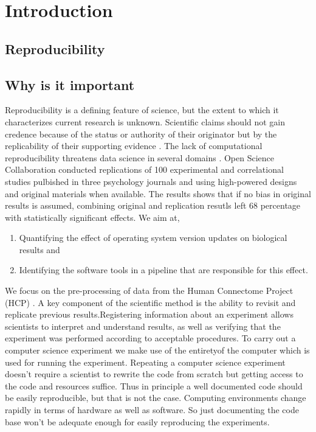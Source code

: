 \chapter{Introduction}
\section{Reproducibility}
\section{Why is it important}
Reproducibility is a defining feature of science, but the extent to which it characterizes current research is unknown. Scientific claims should not gain credence because of the status or authority of their originator but by the replicability of their supporting evidence \cite{aac4716}. The lack of computational reproducibility threatens data science in several domains \cite{Gla15}. Open Science Collaboration \cite{aac4716} conducted replications of 100 experimental and correlational studies pulbished in three psychology journals and using high-powered designs and original materials when available. The results shows that if no bias in original results is assumed, combining original and replication resutls left 68 percentage with statistically significant effects.
We aim at,
\begin{enumerate} 
  \item  Quantifying the effect of operating system version updates on biological results and 
  \item  Identifying the software tools in a pipeline that are responsible for this effect.
\end{enumerate} 
We focus on the pre-processing of data from the Human Connectome Project (HCP) \cite{Gla13}.
A key component of the scientific method is the ability to revisit and replicate previous results.Registering information about an experiment allows scientists to interpret and
understand results, as well as verifying that the experiment was performed according to acceptable procedures. To carry out a computer science experiment we make use of the entiretyof the computer which is used for running the experiment. Repeating a computer science experiment doesn't require a scientist to rewrite the code from scratch but getting access to the code and resources suffice. Thus in principle a well documented code should be easily reproducible, but that is not the case. Computing environments change rapidly in terms of hardware as well as software. So just documenting the code base won't be adequate enough for easily reproducing the experiments.

